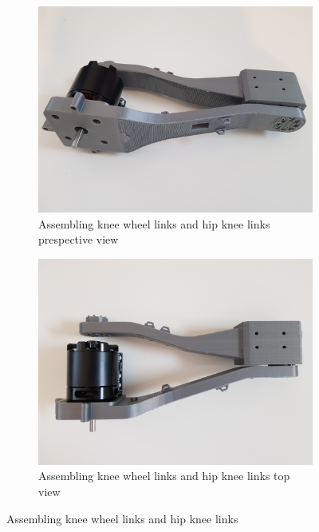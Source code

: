 \begin{figure}[h]
	\centering
	\begin{subfigure}[t]{0.45\textwidth}
		\includegraphics[height=0.7\textwidth]{assembling_knee_wheel_links_and_hip_knee_links_1}
		\caption{Assembling knee wheel links and hip knee links	prespective view}
		\label{fig:assemblingkneewheellinksandhipkneelinksprespectiveview}
	\end{subfigure}
	\begin{subfigure}[t]{0.45\textwidth}
		\includegraphics[height=0.7\textwidth]{assembling_knee_wheel_links_and_hip_knee_links_2}
		\caption{Assembling knee wheel links and hip knee links	top view}
		\label{fig:assemblingkneewheellinksandhipkneelinkstopview}
	\end{subfigure}
	\caption{Assembling knee wheel links and hip knee links}
	\label{fig:Assembling knee wheel links and hip knee links}
\end{figure}

